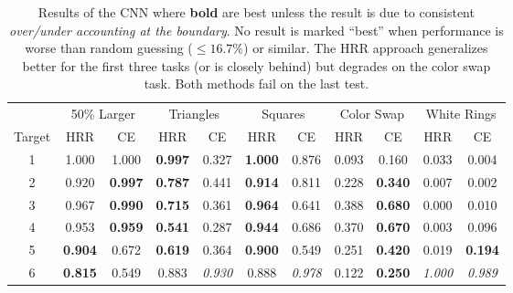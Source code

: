 \documentclass[letterpaper]{article} %
\begin{document}
\begin{table}[!t]
\centering
\begin{tabular}{@{}ccccccccccc@{}}
\toprule
       & \multicolumn{2}{c}{50\% Larger} & \multicolumn{2}{c}{Triangles}   & \multicolumn{2}{c}{Squares}     & \multicolumn{2}{c}{Color Swap} & \multicolumn{2}{c}{White Rings} \\ \cmidrule(r){2-3} \cmidrule(r){4-5} \cmidrule(lr){6-7} \cmidrule(r){8-9} \cmidrule(l){10-11} 
Target & HRR            & CE             & HRR            & CE             & HRR            & CE             & HRR       & CE                 & HRR            & CE             \\ \midrule
1      & 1.000          & 1.000          & \textbf{0.997} & 0.327          & \textbf{1.000} & 0.876          & 0.093     & 0.160              & 0.033          & 0.004          \\
2      & 0.920          & \textbf{0.997} & \textbf{0.787} & 0.441          & \textbf{0.914} & 0.811          & 0.228     & \textbf{0.340}     & 0.007          & 0.002          \\
3      & 0.967          & \textbf{0.990} & \textbf{0.715} & 0.361          & \textbf{0.964} & 0.641          & 0.388     & \textbf{0.680}     & 0.000          & 0.010          \\
4      & 0.953          & \textbf{0.959} & \textbf{0.541} & 0.287          & \textbf{0.944} & 0.686          & 0.370     & \textbf{0.670}     & 0.003          & 0.096          \\
5      & \textbf{0.904} & 0.672          & \textbf{0.619} & 0.364          & \textbf{0.900} & 0.549          & 0.251     & \textbf{0.420}     & 0.019          & \textbf{0.194} \\
6      & \textbf{0.815} & 0.549          & 0.883          & \textit{0.930} & 0.888          & \textit{0.978} & 0.122     & \textbf{0.250}     & \textit{1.000} & \textit{0.989} \\ \bottomrule
\end{tabular}
\caption{Results of the CNN where \textbf{bold} are best unless the result is due to consistent \textit{over/under accounting at the boundary}. No result is marked ``best'' when performance is worse than random guessing ($\leq 16.7\%$) or similar. The HRR approach generalizes better for the first three tasks (or is closely behind) but degrades on the color swap task. Both methods fail on the last test.} 
\label{tbl:set1}
\end{table}
\end{document}

